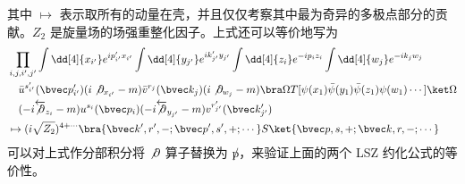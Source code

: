 其中 $\mapsto$ 表示取所有的动量在壳，并且仅仅考察其中最为奇异的多极点部分的贡献。$Z_2$ 是旋量场的场强重整化因子。上式还可以等价地写为
\begin{equation}
\begin{aligned}
&
\prod_{i,j,i',j'}
\int \dd[4]{x_{i'}} e^{ip'_{i'}x_{i'}}
\int \dd[4]{y_{j'}} e^{ik'_{j'}y_{j'}}
\int \dd[4]{z_{i}}e^{-ip_{i}z_{i}}
\int \dd[4]{w_{j}}e^{-ik_{j}w_{j}}
\\
&
\quad \bar u^{s'_{i'}}(\bvec p'_{i'})(i\not \partial_{x_{i'}}-m) \bar v^{r_{j}}(\bvec k_{j})(i\not \partial_{w_{j}}-m) 
\bra\Omega T[\psi(x_1)\bar\psi(y_1)\bar\psi(z_1)\psi(w_1)\cdots]\ket \Omega \\
&
\quad (-i\overleftarrow{\not \partial}_{z_i} -m )u^{s_i}(\bvec p_i) (-i\overleftarrow{\not \partial}_{y_{j'}}-m) v^{r'_{j'}}(\bvec k'_{j'})
\\
&
\mapsto 
(i\sqrt{Z_2})^{4+\cdots} \bra{\bvec k',r',-;\bvec p',s',+;\cdots} S \ket{\bvec p,s,+;\bvec k,r,-;\cdots}
\end{aligned}
\end{equation}
可以对上式作分部积分将 $\not\partial$ 算子替换为 $\not p$，来验证上面的两个 LSZ 约化公式的等价性。